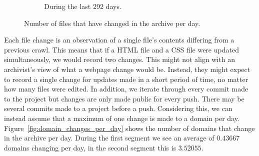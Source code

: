 \documentclass[11pt]{article}
\def \afterio {292}
\def \meandomainchangesfirst {0.43667}
\def \meandomainchangeslast {3.52055}
\begin{document}
\begin{figure}
\begin{subfigure}{.5\textwidth}
      \caption{During the last \afterio{} days.}
    \end{subfigure}
    \caption{Number of files that have changed in the archive per day.}
    \label{fig:file_changes_per_day}
    \end{figure}

    Each file change is an observation of a single file's contents differing from a previous crawl. This means that if a HTML file and a CSS file were updated simultaneously, we would record two changes. This might not align with an archivist's view of what a webpage change would be. Instead, they might expect to record a single change for updates made in a short period of time, no matter how many files were edited. In addition, we iterate through every commit made to the project but changes are only made public for every push. There may be several commits made to a project before a push. Considering this, we can instead assume that a maximum of one change is made to a domain per day. Figure~\ref{fig:domain_changes_per_day} shows the number of domains that change in the archive per day. During the first segment we see an average of $\meandomainchangesfirst$ domains changing per day, in the second segment this is $\meandomainchangeslast$.
\end{document}
